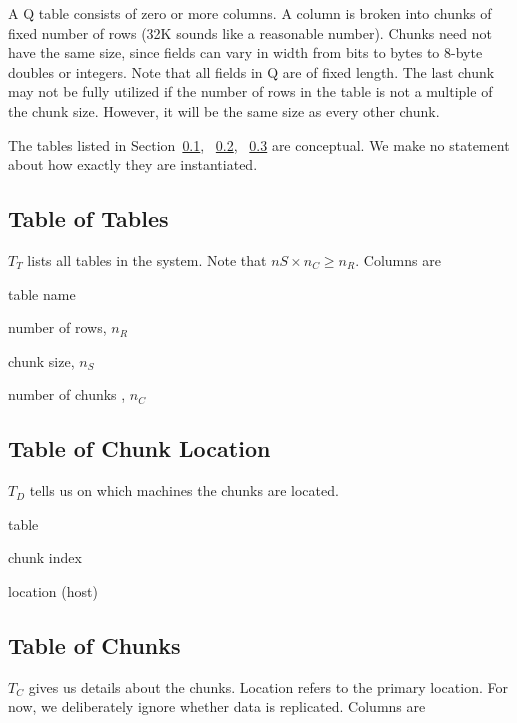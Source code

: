 A Q table consists of zero or more columns. A column is broken into
chunks of fixed number of rows (32K sounds like a reasonable
number). Chunks need not have the same size, since fields can vary in
width from bits to bytes to 8-byte doubles or integers. Note that all
fields in Q are of fixed length.  The last chunk may not be fully
utilized if the number of rows in the table is not a multiple of the
chunk size. However, it will be the same size as every other chunk.

The tables listed in Section~\ref{T_T}, ~\ref{T_D}, ~\ref{T_C} are
conceptual. We make no statement about how exactly they are
instantiated.

\subsection{Table of Tables}
\label{T_T}
\(T_T\) lists all tables in the system. Note that \(nS
\times n_C \geq n_R\). Columns are
\be
\item table name 
\item number of rows, \(n_R\)
\item chunk size, \(n_S\)
\item number of chunks , \(n_C\)
\ee

\subsection{Table of Chunk Location}
\label{T_D}
\(T_D\) tells us on which machines the chunks are located.
\be
\item table 
\item chunk index
\item location (host)
\ee

\subsection{Table of Chunks}
\label{T_C}
\(T_C\) gives us details about the chunks.  Location refers to the 
primary location.  For now, we deliberately ignore whether data is
replicated. Columns are


